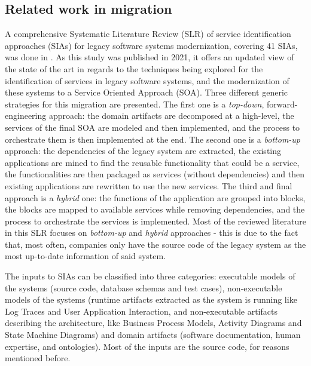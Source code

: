 \subsection{Related work in migration}

A comprehensive Systematic Literature Review (SLR) of service identification approaches (SIAs) for legacy software systems modernization, covering 41 SIAs, was done in \cite{Abdellatif_2021}. As this study was published in 2021, it offers an updated view of the state of the art in regards to the techniques being explored for the identification of services in legacy software systems, and the modernization of these systems to a Service Oriented Approach (SOA). Three different generic strategies for this migration are presented. The first one is a \textit{top-down}, forward-engineering approach: the domain artifacts are decomposed at a high-level, the services of the final SOA are modeled and then implemented, and the process to orchestrate them is then implemented at the end. The second one is a \textit{bottom-up} approach: the dependencies of the legacy system are extracted, the existing applications are mined to find the reusable functionality that could be a service, the functionalities are then packaged as services (without dependencies) and then existing applications are rewritten to use the new services. The third and final approach is a \textit{hybrid} one: the functions of the application are grouped into blocks, the blocks are mapped to available services while removing dependencies, and the process to orchestrate the services is implemented. Most of the reviewed literature in this SLR focuses on \textit{bottom-up} and \textit{hybrid} approaches - this is due to the fact that, most often, companies only have the source code of the legacy system as the most up-to-date information of said system.

The inputs to SIAs can be classified into three categories: executable models of the systems (source code, database schemas and test cases), non-executable models of the systems (runtime artifacts extracted as the system is running like Log Traces and User Application Interaction, and non-executable artifacts describing the architecture, like Business Process Models, Activity Diagrams and State Machine Diagrams) and domain artifacts (software documentation, human expertise, and ontologies). Most of the inputs are the source code, for reasons mentioned before.

